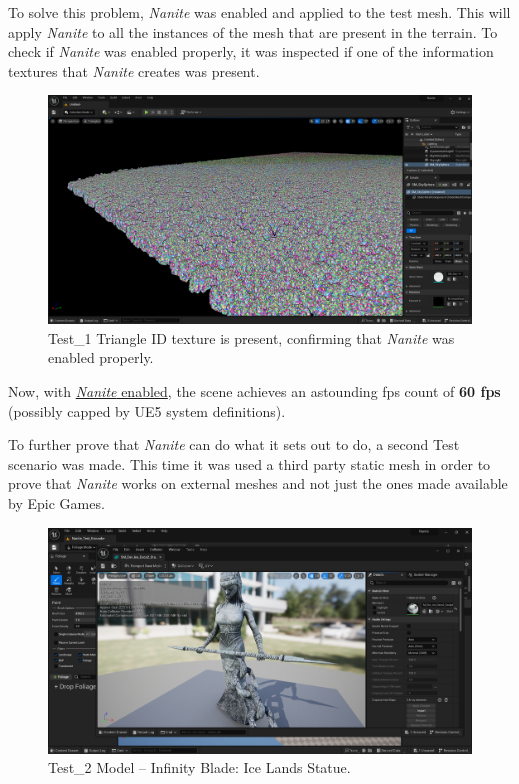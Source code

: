 \documentclass[10pt,journal,compsoc]{IEEEtran}
\begin{document}
\par To solve this problem, \textit{Nanite} was enabled and applied to the test mesh. This will apply \textit{Nanite} to all the instances of the mesh that are present in the terrain. To check if \textit{Nanite} was enabled properly, it was inspected if one of the information textures that \textit{Nanite} creates was present.

\begin{figure}[H]
    \centering
    \includegraphics[scale=0.16]{img/naniterocks.png}
    \caption{Test\_1 Triangle ID texture is present, confirming that \textit{Nanite} was enabled properly.}
    \label{fig:tidrock}
\end{figure}

\par Now, with \underline{\textit{Nanite} enabled}, the scene achieves an astounding fps count of \textbf{60 fps} (possibly capped by UE5 system definitions).

\par To further prove that \textit{Nanite} can do what it sets out to do, a second Test scenario was made. This time it was used a third party static mesh in order to prove that \textit{Nanite} works on external meshes and not just the ones made available by Epic Games.

\begin{figure}[H]
    \centering
    \includegraphics[scale=0.16]{img/image.png}
    \caption{Test\_2 Model – Infinity Blade: Ice Lands Statue.}
    \label{fig:statue}
\end{figure}
\end{document}
